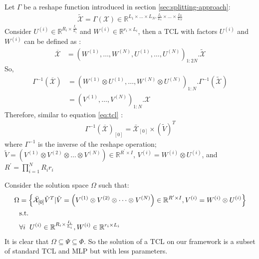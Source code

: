 \documentclass{article}
\begin{document}
Let $\Gamma$ be a reshape function introduced in section \ref{sec:splitting-approach}:
\begin{align}
	\label{eq:subspace-tcl-49}
	\tilde{\mathcal{X}} = \Gamma (\mathcal{X}) \in \mathbb{R}^{L_1\times\dots\times L_N,\frac{I_1}{L_1}\times\dots\times \frac{I_N}{L_N}}
\end{align}
Consider $U^{(i)} \in \mathbb{R}^{R_i\times \frac{I_i}{L_i}}$ and $W^{(i)} \in \mathbb{R}^{r_i\times L_i}$, then a TCL with factors $U^{(i)}$ and $W^{(i)}$ can be defined as :
\begin{align}
	\label{eq:subspace-tcl-50}
	\overline{\mathcal{X}} &= \left(W^{(1)},\dots,W^{(N)}, U^{(1)},\dots,U^{(N)}\right)_{1:2N} .\tilde{\mathcal{X}}
\end{align}
So, 
\begin{align}
	\label{eq:subspace-tcl-50-2}
	\Gamma^{-1}\left(\overline{\mathcal{X}}\right) &= \left(W^{(1)} \otimes U^{(1)} ,\dots,W^{(N)} \otimes U^{(N)}\right)_{1:N} .\Gamma^{-1}(\tilde{\mathcal{X}})
	\nonumber\\
	&= \left(V^{(1)} ,\dots,V^{(N)}\right)_{1:N} .\mathcal{X}
\end{align}
Therefore, similar to equation \ref{eq:tcl} : 
\begin{align}
\Gamma^{-1}(\overline{\mathcal{X}})_{[0]} = 
	\bar{\mathcal{X}}_{[0]} \times (\tilde{V})^T 
\end{align}
where $\Gamma^{-1}$ is the inverse of the reshape operation; $\tilde{V} = \left(V^{(1)}\otimes V^{(2)}\otimes \dots\otimes V^{(N)} \right) \in \mathbb{R}^{R^\prime\times I}$, $V^{(i)} = W^{(i)} \otimes U^{(i)}$, and $R^\prime = \prod_{i=1}^{N} R_i r_i$


Consider the solution space $\Omega$ such that:
\begin{align}
	\label{eq:subspace-tcl-51}
	\Omega &= \left\{
	\bar{\mathcal{X}}_{[0]} \tilde{V}^T | 
	\tilde{V} = \left(V^{(1)}\otimes V^{(2)}\otimes \dots\otimes V^{(N)}\right)  \in \mathbb{R}^{R^\prime\times I}, V^{(i)}  = W^{(i)} \otimes U^{(i)} \right\}
	\nonumber \\
	&\text{s.t.}\nonumber\\
	 &\forall i \hspace{2mm} U^{(i)} \in \mathbb{R}^{R_i \times \frac{I_i}{L_i}}, W^{(i)} \in \mathbb{R}^{r_i\times L_i}
\end{align}
It is clear that $\Omega \subseteq \Psi \subseteq \Phi$. So the solution of a TCL on our framework is a subset of standard TCL and MLP but with less parameters. 
\end{document}
